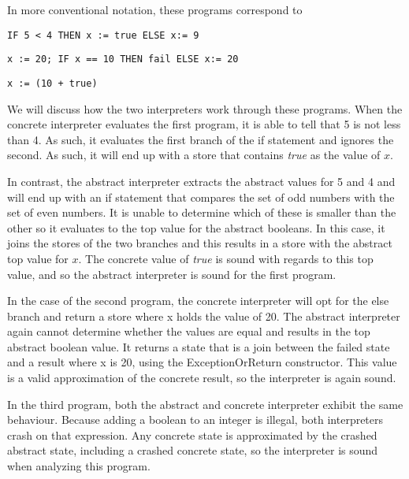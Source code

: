 In more conventional notation, these programs correspond to

\begin{lstlisting}
IF 5 < 4 THEN x := true ELSE x:= 9
\end{lstlisting}

\begin{lstlisting}
x := 20; IF x == 10 THEN fail ELSE x:= 20
\end{lstlisting}

\begin{lstlisting}
x := (10 + true)
\end{lstlisting}

We will discuss how the two interpreters work through these programs. When the
concrete interpreter evaluates the first program, it is able to tell that 5 is
not less than 4. As such, it evaluates the first branch of the if statement and
ignores the second. As such, it will end up with a store that contains
\textit{true} as the value of $x$.

In contrast, the abstract interpreter extracts the abstract values for 5 and 4
and will end up with an if statement that compares the set of odd numbers with
the set of even numbers. It is unable to determine which of these is smaller
than the other so it evaluates to the top value for the abstract booleans. In
this case, it joins the stores of the two branches and this results in a store
with the abstract top value for $x$. The concrete value of \textit{true} is
sound with regards to this top value, and so the abstract interpreter is sound
for the first program.

In the case of the second program, the concrete interpreter will opt for the
else branch and return a store where x holds the value of 20. The abstract
interpreter again cannot determine whether the values are equal and results in
the top abstract boolean value. It returns a state that is a join between the
failed state and a result where x is 20, using the ExceptionOrReturn
constructor. This value is a valid approximation of the concrete result, so the
interpreter is again sound.

In the third program, both the abstract and concrete interpreter exhibit the
same behaviour. Because adding a boolean to an integer is illegal, both
interpreters crash on that expression. Any concrete state is approximated by
the crashed abstract state, including a crashed concrete state, so the
interpreter is sound when analyzing this program.

